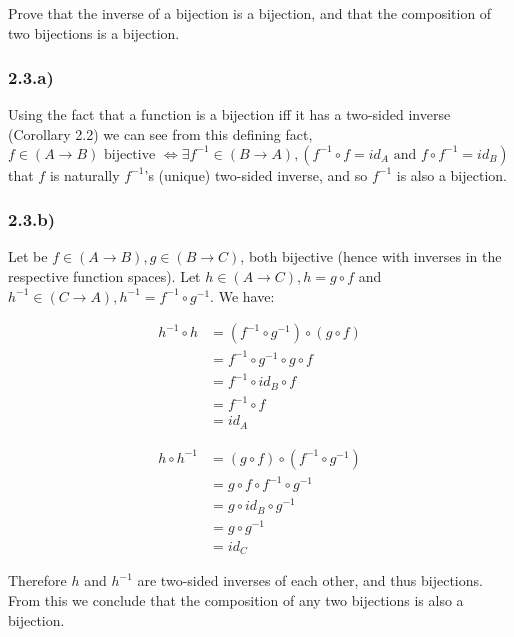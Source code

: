 \documentclass[12pt, letterpaper, twoside]{report}
\begin{document}
Prove that the inverse of a bijection is a bijection, and that the composition of two bijections is a bijection.

\subsubsection*{2.3.a)} Using the fact that a function is a bijection iff it has a two-sided inverse (Corollary 2.2) we can see from this defining fact, $f \in (A \to B) \text{ bijective } \Leftrightarrow \exists f^{-1} \in (B \to A), (f^{-1} \circ f = id_A \text { and } f \circ f^{-1} = id_B)$ that $f$ is naturally $f^{-1}$'s (unique) two-sided inverse, and so $f^{-1}$ is also a bijection.

\subsubsection*{2.3.b)} Let be $f \in (A \to B), g \in (B \to C)$, both bijective (hence with inverses in the respective function spaces). Let $h \in (A \to C), h = g \circ f$ and $h^{-1} \in (C \to A), h^{-1} = f^{-1} \circ g^{-1}$. We have:

$$
\begin{aligned}
h^{-1} \circ h &= (f^{-1} \circ g^{-1}) \circ (g \circ f) \\
               &=  f^{-1} \circ g^{-1}  \circ  g \circ f  \\
               &=  f^{-1} \circ          id_B    \circ f  \\
               &=  f^{-1} \circ                        f  \\
               &=  id_A
\end{aligned}
$$

$$
\begin{aligned}
h \circ h^{-1} &= (g \circ f) \circ (f^{-1} \circ g^{-1}) \\
               &=  g \circ f  \circ  f^{-1} \circ g^{-1}  \\
               &=  g \circ     id_B         \circ g^{-1}  \\
               &=  g \circ                        g^{-1}  \\
               &=  id_C
\end{aligned}
$$

Therefore $h$ and $h^{-1}$ are two-sided inverses of each other, and thus bijections. From this we conclude that the composition of any two bijections is also a bijection.
\end{document}
